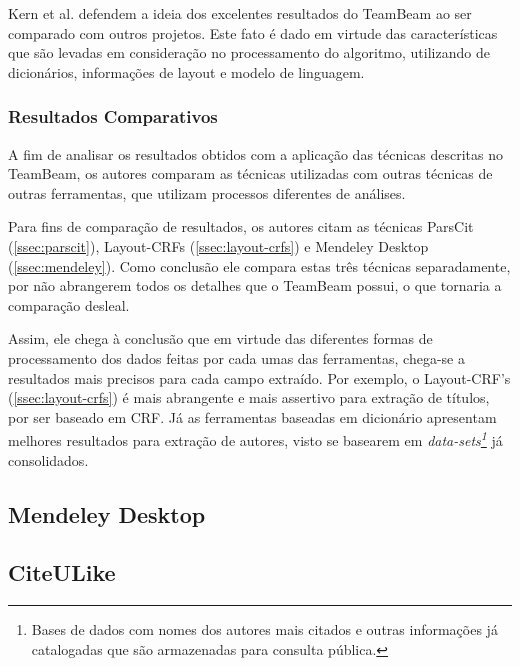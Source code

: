 Kern et al. defendem a ideia dos excelentes resultados do TeamBeam ao ser comparado com outros projetos. Este fato é dado em virtude das características que são levadas em consideração no processamento do algoritmo, utilizando de dicionários, informações de layout e modelo de linguagem.

\subsubsection{Resultados Comparativos}
\label{sssec:teambeam-comparative}

A fim de analisar os resultados obtidos com a aplicação das técnicas descritas no TeamBeam, os autores comparam as técnicas utilizadas com outras técnicas de outras ferramentas, que utilizam processos diferentes de análises.

Para fins de comparação de resultados, os autores citam as técnicas ParsCit (\autoref{ssec:parscit}), Layout-CRFs (\autoref{ssec:layout-crfs}) e Mendeley Desktop (\autoref{ssec:mendeley}). Como conclusão ele compara estas três técnicas separadamente, por não abrangerem todos os detalhes que o TeamBeam possui, o que tornaria a comparação desleal.

Assim, ele chega à conclusão que em virtude das diferentes formas de processamento dos dados feitas por cada umas das ferramentas, chega-se a resultados mais precisos para cada campo extraído. Por exemplo, o Layout-CRF's (\autoref{ssec:layout-crfs}) é mais abrangente e mais assertivo para extração de títulos, por ser baseado em CRF. Já as ferramentas baseadas em dicionário apresentam melhores resultados para extração de autores, visto se basearem em \textit{data-sets\footnote{Bases de dados com nomes dos autores mais citados e outras informações já catalogadas que são armazenadas para consulta pública.}} já consolidados.

\subsection{Mendeley Desktop}
\label{ssec:mendeley}



\subsection{CiteULike}
\label{ssec:citeulike}

